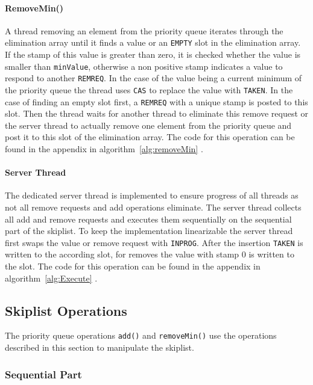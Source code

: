 \paragraph{RemoveMin()} A thread removing an element from the priority queue iterates through the elimination array until it finds a value or an \texttt{EMPTY} slot in the elimination array. If the stamp of this value is greater than zero, it is checked whether the value is smaller than \texttt{minValue}, otherwise a non positive stamp indicates a value to respond to another \texttt{REMREQ}. In the case of the value being a current minimum of the priority queue the thread uses \texttt{CAS} to replace the value with \texttt{TAKEN}. In the case of finding an empty slot first, a \texttt{REMREQ} with a unique stamp is posted to this slot. Then the thread waits for another thread to eliminate this remove request or the server thread to actually remove one element from the priority queue and post it to this slot of the elimination array. The code for this operation can be found in the appendix in algorithm~\ref{alg:removeMin} \cite{calciu_adaptive_2014}.

\paragraph{Server Thread} The dedicated server thread is implemented to ensure progress of all threads as not all remove requests and add operations eliminate. The server thread collects all add and remove requests and executes them sequentially on the sequential part of the skiplist. To keep the implementation linearizable the server thread first swaps the value or remove request with \texttt{INPROG}. After the insertion \texttt{TAKEN} is written to the according slot, for removes the value with stamp 0 is written to the slot. The code for this operation can be found in the appendix in algorithm~\ref{alg:Execute} \cite{calciu_adaptive_2014}.

\subsection{Skiplist Operations}

The priority queue operations \texttt{add()} and \texttt{removeMin()} use the operations described in this section to manipulate the skiplist.

\subsubsection{Sequential Part}

